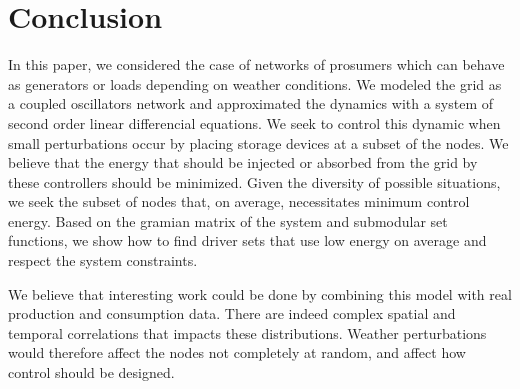 \documentclass[conference]{IEEEtran}
\begin{document}
\section{Conclusion}
\label{sec:Conclusion}
In this paper, we considered the case of networks of prosumers which can behave as generators or loads depending on weather conditions. We modeled the grid as a coupled oscillators network and approximated the dynamics with a system of second order linear differencial equations. We seek to control this dynamic when small perturbations occur by placing storage devices at a subset of the nodes. We believe that the energy that should be injected or absorbed from the grid by these controllers should be minimized. Given the diversity of possible situations, we seek the subset of nodes that, on average, necessitates minimum control energy. Based on the gramian matrix of the system and submodular set functions, we show how to find driver sets that use low energy on average and respect the system constraints. 

We believe that interesting work could be done by combining this model with real production and consumption data. There are indeed complex spatial and temporal correlations that impacts these distributions. Weather perturbations would therefore affect the nodes not completely at random, and affect how control should be designed. 


  

\end{document}
